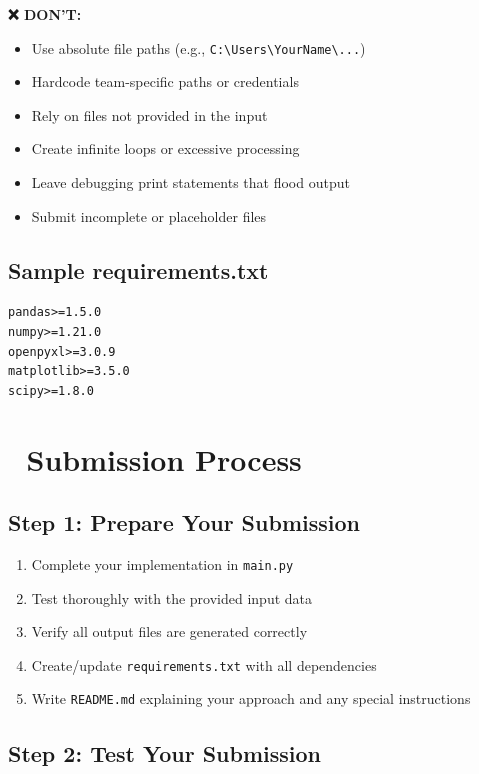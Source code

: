 \documentclass[11pt,a4paper]{article}
\begin{document}
\textbf{❌ DON'T:}
\begin{itemize}
    \item Use absolute file paths (e.g., \texttt{C:\textbackslash Users\textbackslash YourName\textbackslash...})
    \item Hardcode team-specific paths or credentials
    \item Rely on files not provided in the input
    \item Create infinite loops or excessive processing
    \item Leave debugging print statements that flood output
    \item Submit incomplete or placeholder files
\end{itemize}

\subsection*{Sample requirements.txt}

\begin{lstlisting}[caption=Sample requirements.txt]
pandas>=1.5.0
numpy>=1.21.0
openpyxl>=3.0.9
matplotlib>=3.5.0
scipy>=1.8.0
\end{lstlisting}

\section*{📝 Submission Process}

\subsection*{Step 1: Prepare Your Submission}

\begin{enumerate}
    \item Complete your implementation in \texttt{main.py}
    \item Test thoroughly with the provided input data
    \item Verify all output files are generated correctly
    \item Create/update \texttt{requirements.txt} with all dependencies
    \item Write \texttt{README.md} explaining your approach and any special instructions
\end{enumerate}

\subsection*{Step 2: Test Your Submission}
\end{document}
